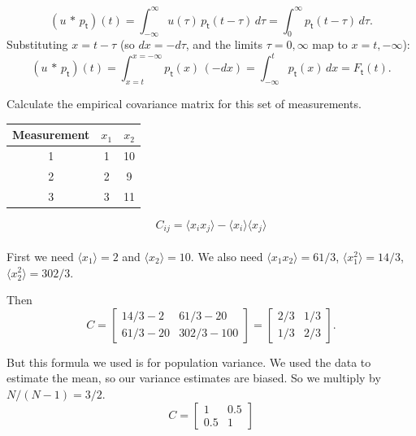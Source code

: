 \begin{solution}
    \[
        (u\,{*}\,p_{\mathsf{t}})(t)
        = \int_{-\infty}^{\infty} u(\tau)\, p_{\mathsf{t}}(t-\tau)\, d\tau
        = \int_{0}^{\infty} p_{\mathsf{t}}(t-\tau)\, d\tau.
    \]
    Substituting $x = t - \tau$ (so $dx = -d\tau$, and the limits $\tau = 0, \infty$ map to $x = t, -\infty$):
    \[
        (u\,{*}\,p_{\mathsf{t}})(t)
        = \int_{x=t}^{x=-\infty} p_{\mathsf{t}}(x)\,(-dx)
        = \int_{-\infty}^{t} p_{\mathsf{t}}(x)\, dx
        = F_{\mathsf{t}}(t).
    \]
\end{solution}

\begin{exercise}
    Calculate the empirical covariance matrix for this set of measurements.
    \begin{table}[h!]
        \centering
        \begin{tabular}{c|cc}
            Measurement & $x_1$ & $x_2$ \\
        \hline
            1 & 1 & 10 \\
            2 & 2 & 9 \\
            3 & 3 & 11 \\
        \end{tabular}
    \end{table} 
\end{exercise}

\begin{solution}
    \[
        C_{ij} = \langle x_ix_j\rangle - \langle x_i\rangle \langle x_j\rangle
    \]\\
    First we need $\langle x_1 \rangle = 2$ and $\langle x_2 \rangle = 10$. We also need $\langle x_1 x_2 \rangle = 61/3$, $\langle x_1^2 \rangle = 14/3$, $\langle x_2^2 \rangle = 302/3$.

    Then
    \[
        C = \begin{bmatrix}
            14/3 - 2 & 61/3 - 20\\
            61/3 - 20 & 302/3 - 100
        \end{bmatrix} =
        \begin{bmatrix}
            2/3 & 1/3 \\
            1/3 & 2/3
        \end{bmatrix}.
    \]

    But this formula we used is for population variance. We used the data to estimate the mean, so our variance estimates are biased. So we multiply by $N/(N-1) = 3/2$.
    \[
        \boxed{C = \begin{bmatrix}
            1 & 0.5\\
            0.5 & 1
        \end{bmatrix}}
    \]
\end{solution}

